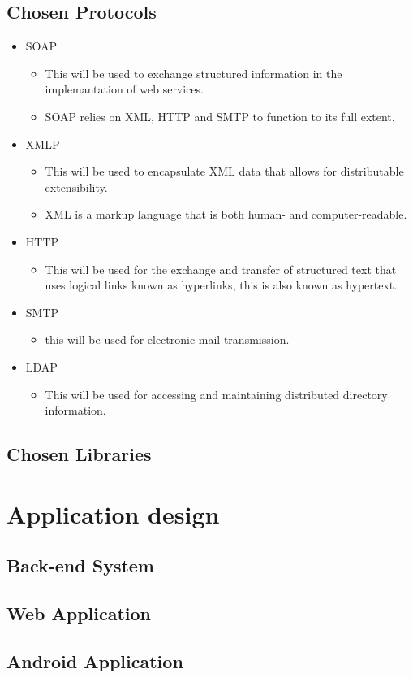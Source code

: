 \documentclass[12pt,a4paper]{article}
\begin{document}
\subsection{Chosen Protocols}
\begin{itemize}
	\item SOAP
		\begin{itemize}
			\item This will be used to exchange structured information in the implemantation of web services.
			\item SOAP relies on XML, HTTP and SMTP to function to its full extent.
		\end{itemize}
	\item XMLP
		\begin{itemize}
			\item This will be used to encapsulate XML data that allows for distributable extensibility.
			\item XML is a markup language that is both human- and computer-readable.
		\end{itemize}
	\item HTTP
		\begin{itemize}
			\item This will be used for the exchange and transfer of structured text that uses logical links known as hyperlinks, this is also known as hypertext.
		\end{itemize}
	\item SMTP
		\begin{itemize}
			\item this will be used for electronic mail transmission.
		\end{itemize}
	\item LDAP
		\begin{itemize}
			\item This will be used for accessing and maintaining distributed directory information.
		\end{itemize}
\end{itemize}
\subsection{Chosen Libraries}
\pagebreak
\section{Application design}
\subsection{Back-end System}
\subsection{Web Application}
\subsection{Android Application}
\end{document}
